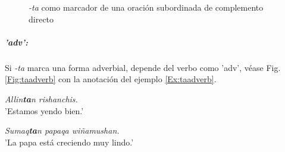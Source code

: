 \documentclass[a4paper,11pt,DIV12]{scrartcl}
\begin{document}
\begin{figure}
 \begin{center}
\end{center}
\caption{{\em -ta} como marcador de una oraci\'on subordinada de complemento directo}\label{Fig:taclause}
\end{figure}

\subparagraph{'adv':} Si {\em -ta} marca una forma adverbial, depende del verbo como 'adv', v\'ease Fig. \ref{Fig:taadverb} con la anotaci\'on del ejemplo \ref{Ex:taadverb}.

\begin{examples}
 \item\label{Ex:taadverb} {\em Allin\textbf{ta}n rishanchis.}\\
      'Estamos yendo bien.'
 \item {\em Sumaq\textbf{ta}n papaqa wi\~namushan.}\\
      'La papa est\'a creciendo muy lindo.'\\
          	 \hfill{\small \citep[121]{Cusi2}}
\end{examples}
\end{document}
